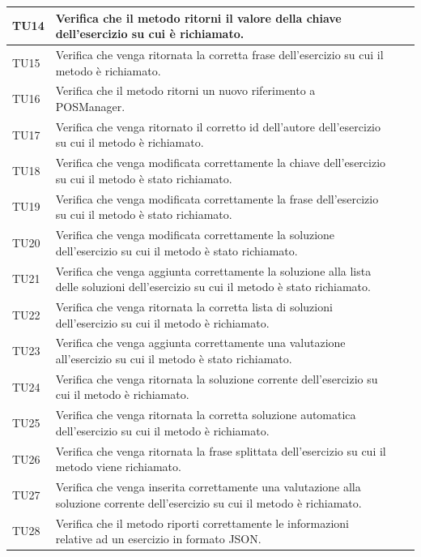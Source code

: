 \begin{longtable}{|>{\centering\arraybackslash}m{1.6cm}|>{\centering\arraybackslash}m{6.41cm}|>{\centering\arraybackslash}m{3.1cm}| c |}
		TU14 & Verifica che il metodo ritorni il valore della chiave dell'esercizio su cui è richiamato. \\ \hline
		TU15 & Verifica che venga ritornata la corretta frase dell'esercizio su cui il metodo è richiamato. \\ \hline
		TU16 & Verifica che il metodo ritorni un nuovo riferimento a POSManager.\\ \hline
		TU17 & Verifica che venga ritornato il corretto id dell'autore dell'esercizio su cui il metodo è richiamato.\\ \hline
		TU18 & Verifica che venga modificata correttamente la chiave dell'esercizio su cui il metodo è stato richiamato.\\ \hline
		TU19 & Verifica che venga modificata correttamente la frase dell'esercizio su cui il metodo è stato richiamato.\\ \hline
		TU20 & Verifica che venga modificata correttamente la soluzione dell'esercizio su cui il metodo è stato richiamato.\\ \hline
		TU21 & Verifica che venga aggiunta correttamente la soluzione alla lista delle soluzioni dell'esercizio su cui il metodo è stato richiamato.\\ \hline
		TU22 & Verifica che venga ritornata la corretta lista di soluzioni dell'esercizio su cui il metodo è richiamato.\\ \hline
		TU23 & Verifica che venga aggiunta correttamente una valutazione all'esercizio su cui il metodo è stato richiamato.\\ \hline
		TU24 & Verifica che venga ritornata la soluzione corrente dell'esercizio su cui il metodo è richiamato.\\ \hline
		TU25 & Verifica che venga ritornata la corretta soluzione automatica dell'esercizio su cui il metodo è richiamato. \\ \hline
		TU26 & Verifica che venga ritornata la frase splittata dell'esercizio su cui il metodo viene richiamato.\\ \hline
		TU27 & Verifica che venga inserita correttamente una valutazione alla soluzione corrente dell'esercizio su cui il metodo è richiamato.\\ \hline		
		TU28 & Verifica che il metodo riporti correttamente le informazioni relative ad un esercizio in formato JSON. \\ \hline
			

\end{longtable}
